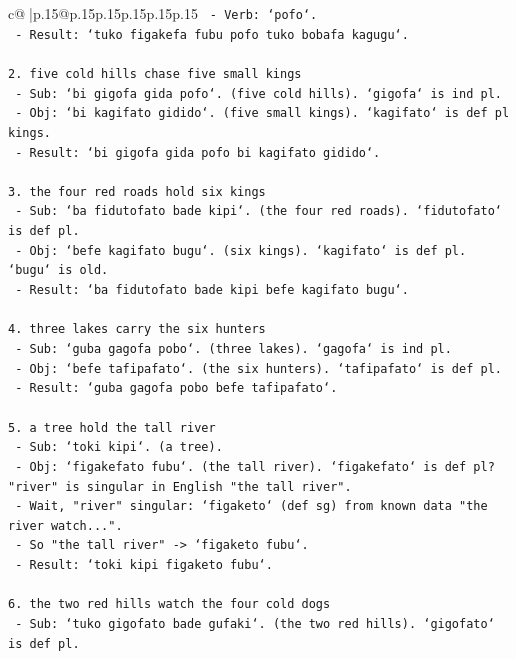 \documentclass{article}
\begin{document}
{\begin{supertabular}{c@{$\;$}|p{.15\linewidth}@{}p{.15\linewidth}p{.15\linewidth}p{.15\linewidth}p{.15\linewidth}p{.15\linewidth}}
{{{\texttt{   {-} Verb: `pofo`.} \\
\texttt{   {-} Result: `tuko figakefa fubu pofo tuko bobafa kagugu`.} \\
\\ 
\texttt{2. five cold hills chase five small kings} \\
\texttt{   {-} Sub: `bi gigofa gida pofo`. (five cold hills). `gigofa` is ind pl.} \\
\texttt{   {-} Obj: `bi kagifato gidido`. (five small kings). `kagifato` is def pl kings.} \\
\texttt{   {-} Result: `bi gigofa gida pofo bi kagifato gidido`.} \\
\\ 
\texttt{3. the four red roads hold six kings} \\
\texttt{   {-} Sub: `ba fidutofato bade kipi`. (the four red roads). `fidutofato` is def pl.} \\
\texttt{   {-} Obj: `befe kagifato bugu`. (six kings). `kagifato` is def pl. `bugu` is old.} \\
\texttt{   {-} Result: `ba fidutofato bade kipi befe kagifato bugu`.} \\
\\ 
\texttt{4. three lakes carry the six hunters} \\
\texttt{   {-} Sub: `guba gagofa pobo`. (three lakes). `gagofa` is ind pl.} \\
\texttt{   {-} Obj: `befe tafipafato`. (the six hunters). `tafipafato` is def pl.} \\
\texttt{   {-} Result: `guba gagofa pobo befe tafipafato`.} \\
\\ 
\texttt{5. a tree hold the tall river} \\
\texttt{   {-} Sub: `toki kipi`. (a tree).} \\
\texttt{   {-} Obj: `figakefato fubu`. (the tall river). `figakefato` is def pl? "river" is singular in English "the tall river".} \\
\texttt{   {-} Wait, "river" singular: `figaketo` (def sg) from known data "the river watch...".} \\
\texttt{   {-} So "the tall river" {-}> `figaketo fubu`.} \\
\texttt{   {-} Result: `toki kipi figaketo fubu`.} \\
\\ 
\texttt{6. the two red hills watch the four cold dogs} \\
\texttt{   {-} Sub: `tuko gigofato bade gufaki`. (the two red hills). `gigofato` is def pl.} \\
}}}
\end{supertabular}}
\end{document}
